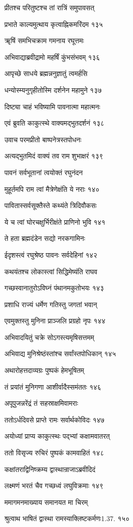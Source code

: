 प्रीतश्च परितुष्टश्च तां रात्रिं समुपावसत्

प्रभाते काल्यमुत्थाय कृत्वाह्निकमरिंदम १३५

ॠषिं समभिचक्राम गमनाय रघूत्तमः

अभिवाद्याब्रवीद्रामो महर्षिं कुंभसंभवम् १३६

आपृच्छे साधये ब्रह्मन्ननुज्ञातुं त्वमर्हसि

धन्योस्म्यनुगृहीतोस्मि दर्शनेन महामुने १३७

दिष्ट्या चाहं भविष्यामि पावनात्मा महात्मनः

एवं ब्रुवति काकुत्स्थे वाक्यमद्भुतदर्शनं १३८

उवाच परमप्रीतो बाष्पनेत्रस्तपोधनः

अत्यद्भुतमिदं वाक्यं तव राम शुभाक्षरं १३९

पावनं सर्वभूतानां त्वयोक्तं रघुनंदन

मुहूर्तमपि राम त्वां मैत्रेणेक्षंति ये नराः १४०

पावितास्सर्वसूक्तैस्ते कथ्यंते त्रिदिवौकसः

ये च त्वां घोरचक्षुर्भिरीक्षंते प्राणिनो भुवि १४१

ते हता ब्रह्मदंडेन सद्यो नरकगामिनः

ईदृशस्त्वं रघुश्रेष्ठ पावनः सर्वदेहिनां १४२

कथयंतश्च लोकास्त्वां सिद्धिमेष्यंति राघव

गच्छस्वानातुरोऽविघ्नं पंथानमकुतोभयः १४३

प्रशाधि राज्यं धर्मेण गतिस्तु जगतां भवान्

एवमुक्तस्तु मुनिना प्राञ्जलि प्रग्रहो नृपः १४४

अभिवादयितुं चक्रे सोऽगस्त्यमृषिसत्तमम्

अभिवाद्य मुनिश्रेष्ठंस्तांश्च सर्वांस्तपोधिकान् १४५

अथारोहत्तदाव्यग्रः पुष्पकं हेमभूषितम्

तं प्रयांतं मुनिगणा आशीर्वादैस्समंततः १४६

अपूपुजन्नरेंद्रं तं सहस्राक्षमिवामराः

ततोऽर्धदिवसे प्राप्ते रामः सर्वार्थकोविदः १४७

अयोध्यां प्राप्य काकुत्स्थः पद्भ्यां कक्षामवातरत्

ततो विसृज्य रुचिरं पुष्पकं कामवाहितं १४८

कक्षांतराद्विनिष्क्रम्य द्वास्थान्राजाऽब्रवीदिदं

लक्ष्मणं भरतं चैव गच्छध्वं लघुविक्रमाः १४९

ममागमनमाख्याय समानयत मा चिरम्

श्रुत्वाथ भाषितं द्वास्था रामस्याक्लिष्टकर्मणः1.37. १५०

